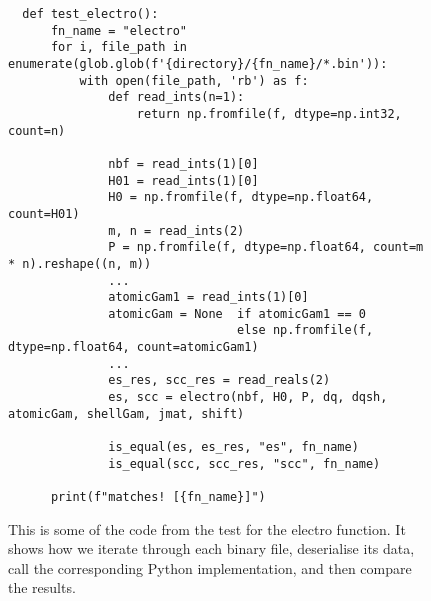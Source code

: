 \begin{figure}[H]
\begin{verbatim}
  def test_electro():
      fn_name = "electro"
      for i, file_path in enumerate(glob.glob(f'{directory}/{fn_name}/*.bin')):
          with open(file_path, 'rb') as f:
              def read_ints(n=1):
                  return np.fromfile(f, dtype=np.int32, count=n)

              nbf = read_ints(1)[0]
              H01 = read_ints(1)[0]
              H0 = np.fromfile(f, dtype=np.float64, count=H01)
              m, n = read_ints(2)
              P = np.fromfile(f, dtype=np.float64, count=m * n).reshape((n, m))
              ...
              atomicGam1 = read_ints(1)[0]
              atomicGam = None  if atomicGam1 == 0
                                else np.fromfile(f, dtype=np.float64, count=atomicGam1)
              ...
              es_res, scc_res = read_reals(2)
              es, scc = electro(nbf, H0, P, dq, dqsh, atomicGam, shellGam, jmat, shift)

              is_equal(es, es_res, "es", fn_name)
              is_equal(scc, scc_res, "scc", fn_name)

      print(f"matches! [{fn_name}]")
\end{verbatim}
\caption{This is some of the code from the test for the electro function. It shows how we iterate through each binary file, deserialise its data, call the corresponding Python implementation, and then compare the results.}
\label{fig:testcode}
\end{figure}
